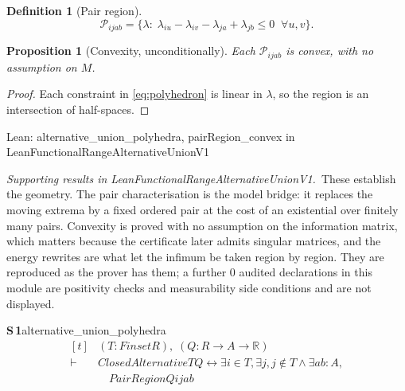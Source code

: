\documentclass[conference]{IEEEtran}
\newtheorem{proposition}[theorem]{Proposition}
\theoremstyle{definition}
\newtheorem{definition}[theorem]{Definition}
\newcommand{\lean}[1]{\textsf{\footnotesize #1}}
\newcommand{\leanbox}[1]{%
  \par\vspace{2pt}\noindent
  {\footnotesize\textsf{Lean: #1}}\par\vspace{2pt}}
\begin{document}
\begin{definition}[Pair region]
\begin{equation}
\mathcal{P}_{ijab}=\bigl\{\lambda:\;
\lambda_{iu}-\lambda_{iv}-\lambda_{ja}+\lambda_{jb}\leq 0
\;\;\forall u,v\bigr\}.
\label{eq:polyhedron}
\end{equation}
\end{definition}

\begin{proposition}[Convexity, unconditionally]
\label{prop:convex}
Each $\mathcal{P}_{ijab}$ is convex, with no assumption on $M$.
\end{proposition}

\begin{proof}
Each constraint in \eqref{eq:polyhedron} is linear in $\lambda$, so the region is an
intersection of half-spaces.
\end{proof}

\leanbox{\lean{alternative\_union\_polyhedra}, \lean{pairRegion\_convex} in
\lean{LeanFunctionalRangeAlternativeUnionV1}}

\noindent\emph{Supporting results in \lean{LeanFunctionalRangeAlternativeUnionV1}.}~These establish the geometry. The pair characterisation is the model bridge: it replaces the moving extrema by a fixed ordered pair at the cost of an existential over finitely many pairs. Convexity is proved with no assumption on the information matrix, which matters because the certificate later admits singular matrices, and the energy rewrites are what let the infimum be taken region by region. They are reproduced as the prover has them; a further $0$ audited declarations in this module are positivity checks and measurability side conditions and are not displayed.

\noindent\textbf{S\,1}\quad\lean{alternative\_union\_polyhedra}
{\footnotesize\[ \begin{aligned}[t]
&(\mathit{T} : \mathit{Finset} \mathit{R}),\; (\mathit{Q} : \mathit{R} \to \mathit{A} \to \mathbb{R} )\\
\vdash\;&\mathit{ClosedAlternative} \mathit{T} \mathit{Q} \leftrightarrow \exists \mathit{i} \in \mathit{T}, \exists \mathit{j}, \mathit{j} \notin \mathit{T} \wedge \exists \mathit{a} \mathit{b} : \mathit{A},\\
&\quad \mathit{PairRegion} \mathit{Q} \mathit{i} \mathit{j} \mathit{a} \mathit{b}
\end{aligned} \]}
\end{document}
